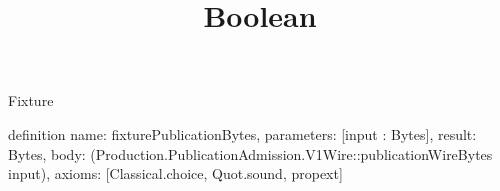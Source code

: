 \begin{lexlean}{Fixture}
\title{Boolean}
\begin{semanticmodule}
definition{
  name: fixturePublicationBytes,
  parameters: [input : Bytes],
  result: Bytes,
  body: (Production.PublicationAdmission.V1Wire::publicationWireBytes input),
  axioms: [Classical.choice, Quot.sound, propext]
}
\end{semanticmodule}
\end{lexlean}
